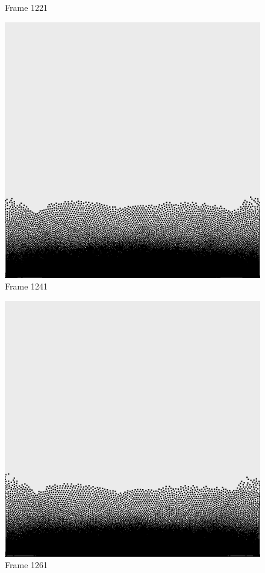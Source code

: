 \documentclass[a4paper, 12pt, oneside]{book}
\begin{document}
\begin{figure}[!ht]
\begin{center}
            Frame 1221
        \end{center}
    \endminipage
    \hfill
        \begin{center}
            \includegraphics[width=\linewidth]{images/test_case_1/1241.png}
            Frame 1241
        \end{center}
    \endminipage
    \hfill
        \begin{center}
            \includegraphics[width=\linewidth]{images/test_case_1/1261.png}
            Frame 1261
        \end{center}
    \endminipage
    \hfill


\end{figure}
\end{document}
